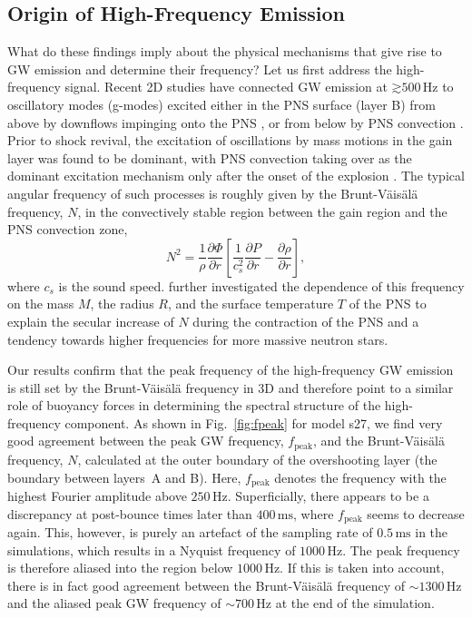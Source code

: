 \subsection{Origin of High-Frequency Emission}
What do these findings imply about the physical mechanisms that give
rise to GW emission and determine their frequency? Let us first
address the high-frequency signal. Recent 2D studies have connected GW
emission at $\mathord{\gtrsim} 500 \, \mathrm{Hz}$ to oscillatory modes
(g-modes) excited either in the PNS surface (layer B) from above by
downflows impinging onto the PNS
\citep{marek_08,murphy_09,mueller_13}, or from below by PNS
convection \citep{marek_08,mueller_e_12,mueller_13}. Prior to shock
revival, the excitation of oscillations by mass motions in the gain layer was found
to be dominant, with PNS convection taking over as the dominant
excitation mechanism only after the onset of the explosion \citep{mueller_e_12,mueller_13}.
The typical angular frequency of such
processes is roughly given by the Brunt-V\"{a}is\"{a}l\"{a} frequency, $N$,
in the convectively stable region between the gain region and the PNS convection zone,
\begin{equation} \label{eq:BV}
N^2 = \frac{1}{\rho} \frac{\partial \Phi}{\partial r} \left [ \frac{1}{c_s^2} \frac{\partial P}{\partial r} - \frac{\partial \rho}{\partial r} \right ],
\end{equation}
where $c_s$ is the sound speed. \citet{mueller_13} further investigated the dependence
of this frequency on the mass $M$, the radius $R$, and the surface temperature $T$ of the PNS to explain the secular
increase of $N$ during the contraction of the PNS and
a tendency towards higher frequencies for more massive neutron stars.

Our results confirm that the peak frequency of the high-frequency GW emission
is still set by the Brunt-V\"{a}is\"{a}l\"{a} frequency in 3D and therefore point to a
similar role of buoyancy forces in determining the spectral structure
of the high-frequency component. As shown in Fig.~\ref{fig:fpeak} for
model s27, we find very good agreement between the peak GW
frequency, $f_\mathrm{peak}$, and the Brunt-V\"{a}is\"{a}l\"{a}
frequency, $N$, calculated at the outer boundary of the overshooting
layer (the boundary between layers~A and B).
Here, $f_\mathrm{peak}$ denotes the frequency with the highest Fourier amplitude above $250 \, \mathrm{Hz}$.
Superficially, there appears to be a discrepancy at post-bounce times
later than $400 \, \mathrm{ms}$, where $f_\mathrm{peak}$ seems to decrease
again. This, however, is purely an artefact of the
sampling rate of $0.5 \, \mathrm{ms}$ in the simulations, which results
in a Nyquist frequency of $1000 \, \mathrm{Hz}$. The peak frequency is
therefore aliased into the region below $1000 \, \mathrm{Hz}$. If
this is taken into account, there is in fact good agreement between
the Brunt-V\"{a}is\"{a}l\"{a} frequency of $\mathord{\sim} 1300
\, \mathrm{Hz}$ and the aliased peak GW frequency of 
$\mathord{\sim} 700\, \mathrm{Hz}$ at the end of the simulation.

